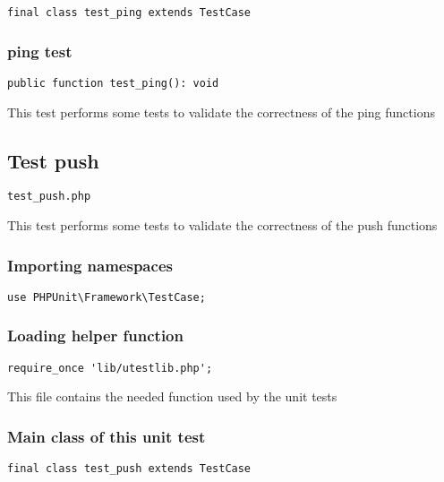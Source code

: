 \documentclass[a4paper]{article}
\begin{document}
\begin{lstlisting}
final class test_ping extends TestCase
\end{lstlisting}

\hypertarget{toc305}{}
\subsubsection{ping test}

\begin{lstlisting}
public function test_ping(): void
\end{lstlisting}

This test performs some tests to validate the correctness
of the ping functions

\hypertarget{toc306}{}
\subsection{Test push}

\begin{lstlisting}
test_push.php
\end{lstlisting}

This test performs some tests to validate the correctness
of the push functions

\hypertarget{toc307}{}
\subsubsection{Importing namespaces}

\begin{lstlisting}
use PHPUnit\Framework\TestCase;
\end{lstlisting}

\hypertarget{toc308}{}
\subsubsection{Loading helper function}

\begin{lstlisting}
require_once 'lib/utestlib.php';
\end{lstlisting}

This file contains the needed function used by the unit tests

\hypertarget{toc309}{}
\subsubsection{Main class of this unit test}

\begin{lstlisting}
final class test_push extends TestCase
\end{lstlisting}
\end{document}
